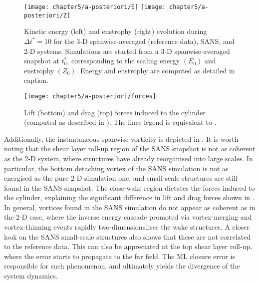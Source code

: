 \documentclass[../main.tex]{subfiles}
\begin{document}
\begin{figure}[t]
\centering
\texttt{[image: chapter5/a-posteriori/E]}
\texttt{[image: chapter5/a-posteriori/Z]}
\caption{Kinetic energy (left) and enstrophy (right) evolution during $\Delta t^*=10$ for the 3-D spanwise-averaged (reference data), SANS, and 2-D systems.
Simulations are started from a 3-D spanwise-averaged snapshot at $t^*_0$, corresponding to the scaling energy $(E_0)$ and enstrophy $(Z_0)$.
Energy and enstrophy are computed as detailed in  caption.}
\label{fig:E_Z_a-posteriori}
\end{figure}
\begin{figure}[t]
\centering
\texttt{[image: chapter5/a-posteriori/forces]}
\caption{Lift (bottom) and drag (top) forces induced to the cylinder (computed as described in ).
The lines legend is equivalent to .}
\label{fig:forces_a-posteriori}
\end{figure}

Additionally, the instantaneous spanwise vorticity is depicted in .
It is worth noting that the shear layer roll-up region of the SANS snapshot is not as coherent as the 2-D system, where structures have already reorganised into large scales.
In particular, the bottom detaching vortex of the SANS simulation is not as energised as the pure 2-D simulation one, and small-scale structures are still found in the SANS snapshot.
The close-wake region dictates the forces induced to the cylinder, explaining the significant difference in lift and drag forces shown in .
In general, vortices found in the SANS simulation do not appear as coherent as in the 2-D case, where the inverse energy cascade promoted via vortex-merging and vortex-thinning events rapidly two-dimensionalises the wake structures.
A closer look on the SANS small-scale structures also shows that these are not correlated to the reference data.
This can also be appreciated at the top shear layer roll-up, where the error starts to propagate to the far field.
The ML closure error is responsible for such phenomenon, and ultimately yields the divergence of the system dynamics.
\end{document}
